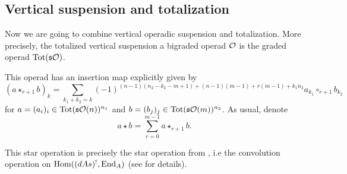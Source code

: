 \documentclass[twoside]{article}
\begin{document}
\subsection{Vertical suspension and totalization} 

Now we are going to combine vertical operadic suspension and totalization. More precisely, the totalized vertical suspension a bigraded operad ${\mathcal O}$ is the graded operad $\mathrm{Tot}(\mathfrak{s}{\mathcal O})$. 


This operad has an insertion map explicitly given by
\begin{equation}\label{star}
(a\star_{r+1} b)_k=\sum_{k_1+k_2=k}(-1)^{(n-1)(n_2-k_2-m+1)+(n-1)(m-1)+r(m-1)+k_1n_2}a_{k_1}\circ_{r+1}b_{k_2}
\end{equation}
for $a=(a_i)_i\in \mathrm{Tot}(\mathfrak{s}{\mathcal O}(n))^{n_1}$ and $b=(b_j)_j\in \mathrm{Tot}(\mathfrak{s}{\mathcal O}(m))^{n_2}$. As usual, denote \[a\star b=\sum_{r=0}^{m-1}a\star_{r+1}b.\]

This star operation is precisely the star operation from \cite[\S 5.1]{LRW}, i.e the convolution operation on $\operatorname{Hom}((dAs)^!, \operatorname{End}_A)$ (see \cite{LRW} for details). 

\end{document}
